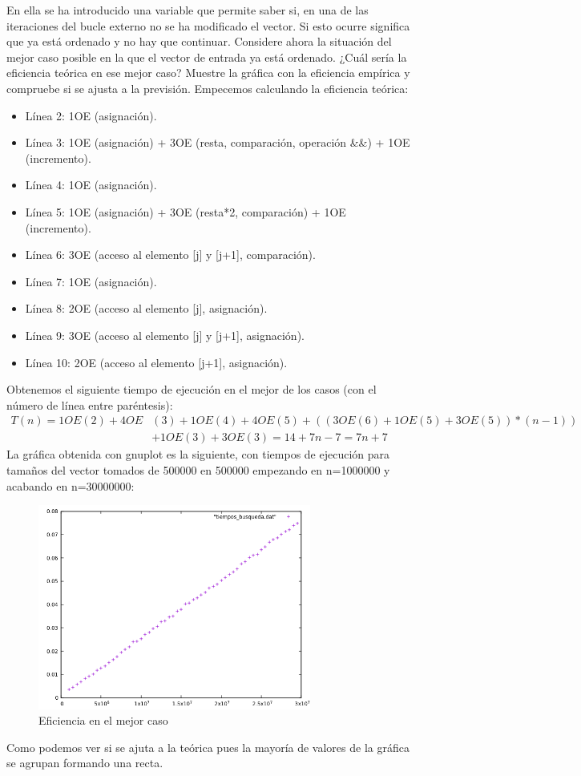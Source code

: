\documentclass{article}
\begin{document}
En ella se ha introducido una variable que permite saber si, en una de las iteraciones del
bucle externo no se ha modificado el vector. Si esto ocurre significa que ya está ordenado
y no hay que continuar.
Considere ahora la situación del mejor caso posible en la que el vector de entrada ya está
ordenado. ¿Cuál sería la eficiencia teórica en ese mejor caso? Muestre la gráfica con la
eficiencia empírica y compruebe si se ajusta a la previsión.
\clearpage
Empecemos calculando la eficiencia teórica:
\begin{itemize}
	\item Línea 2: 1OE (asignación).
	\item Línea 3: 1OE (asignación) + 3OE (resta, comparación,
          operación \&\&) + 1OE (incremento).
	\item Línea 4: 1OE (asignación).
	\item Línea 5: 1OE (asignación) + 3OE (resta*2, comparación) + 1OE (incremento).
	\item Línea 6: 3OE (acceso al elemento [j] y [j+1], comparación).
	\item Línea 7: 1OE (asignación).
	\item Línea 8: 2OE (acceso al elemento [j], asignación).
	\item Línea 9: 3OE (acceso al elemento [j] y [j+1], asignación).
	\item Línea 10: 2OE (acceso al elemento [j+1], asignación).
\end{itemize}
Obtenemos el siguiente tiempo de ejecución en el mejor de los casos
(con el número de línea entre paréntesis):
\begin{align*}
  T(n)= 1OE(2) + 4OE&(3) + 1OE(4) + 4OE(5) + (( 3OE(6) + 1OE(5) +
  3OE(5) )*(n-1))\\& + 1OE(3) + 3OE(3) = 14+7n-7 = 7n+7
\end{align*}
La gráfica obtenida con gnuplot es la siguiente, con tiempos de ejecución para tamaños del vector tomados de 500000 en 500000 empezando en n=1000000 y acabando en n=30000000:
\begin{figure}[H]
  \caption{Eficiencia en el mejor caso}
  \centering
  \includegraphics[width=0.8\textwidth]{ejer5/grafica.png}
\end{figure}
Como podemos ver si se ajuta a la teórica pues la mayoría de valores
de la gráfica se agrupan formando una recta.
\clearpage
\end{document}

